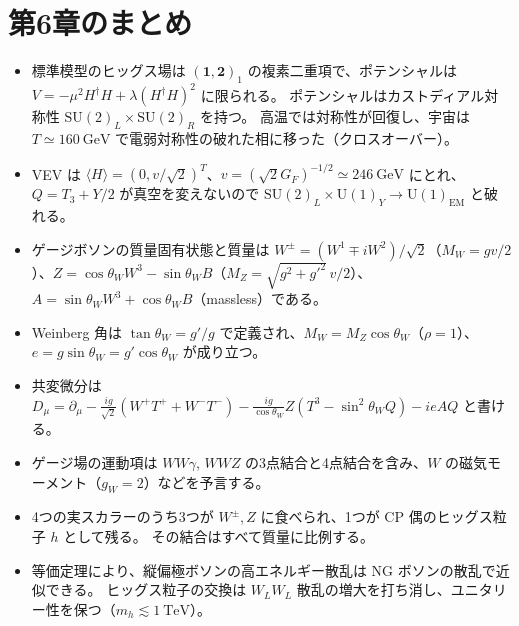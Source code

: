 \documentclass[uplatex,dvipdfmx,a4paper,11pt,openany]{jsbook}
\numberwithin{equation}{chapter}
\theoremstyle{definition}
\theoremstyle{plain}
\theoremstyle{remark}
\newcommand{\SU}{\mathrm{SU}}
\newcommand{\U}{\mathrm{U}}
\begin{document}
\section*{第6章のまとめ}
\begin{itemize}
    \item 標準模型のヒッグス場は $(\mathbf1,\mathbf2)_1$ の複素二重項で、ポテンシャルは $V=-\mu^2H^\dagger H+\lambda(H^\dagger H)^2$ に限られる。
    ポテンシャルはカストディアル対称性 $\SU(2)_L\times\SU(2)_R$ を持つ。
    高温では対称性が回復し、宇宙は $T\simeq160\ \mathrm{GeV}$ で電弱対称性の破れた相に移った（クロスオーバー）。
    \item VEV は $\langle H\rangle=(0,v/\sqrt2)^T$、$v=(\sqrt2G_F)^{-1/2}\simeq246\ \mathrm{GeV}$ にとれ、
    $Q=T_3+Y/2$ が真空を変えないので $\SU(2)_L\times\U(1)_Y\to\U(1)_{\mathrm{EM}}$ と破れる。
    \item ゲージボソンの質量固有状態と質量は
    $W^\pm=(W^1\mp iW^2)/\sqrt2$（$M_W=gv/2$）、$Z=\cos\theta_WW^3-\sin\theta_WB$（$M_Z=\sqrt{g^2+g'^2}\,v/2$）、
    $A=\sin\theta_WW^3+\cos\theta_WB$（massless）である。
    \item Weinberg 角は $\tan\theta_W=g'/g$ で定義され、$M_W=M_Z\cos\theta_W$（$\rho=1$）、$e=g\sin\theta_W=g'\cos\theta_W$ が成り立つ。
    \item 共変微分は $D_\mu=\partial_\mu-\frac{ig}{\sqrt2}(W^+T^++W^-T^-)-\frac{ig}{\cos\theta_W}Z(T^3-\sin^2\theta_WQ)-ieAQ$ と書ける。
    \item ゲージ場の運動項は $WW\gamma$, $WWZ$ の3点結合と4点結合を含み、$W$ の磁気モーメント（$g_W=2$）などを予言する。
    \item 4つの実スカラーのうち3つが $W^\pm,Z$ に食べられ、1つが CP 偶のヒッグス粒子 $h$ として残る。
    その結合はすべて質量に比例する。
    \item 等価定理により、縦偏極ボソンの高エネルギー散乱は NG ボソンの散乱で近似できる。
    ヒッグス粒子の交換は $W_LW_L$ 散乱の増大を打ち消し、ユニタリー性を保つ（$m_h\lesssim1\ \mathrm{TeV}$）。
\end{itemize}
\end{document}
